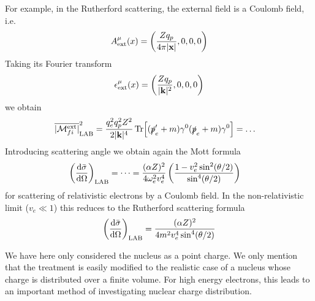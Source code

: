 \documentclass[TheoreticalPhy_ModB.tex]{subfiles}
\begin{document}
For example, in the Rutherford scattering, the external field is a Coulomb field, i.e.
\[A^\mu_{\textup{ext}}(x)=\left(\frac{Zq_p}{4\pi|\vec x|},0,0,0\right)\]
Taking its Fourier transform
\[\epsilon^\mu_{\textup{ext}}(x)=\left(\frac{Zq_p}{|\vec k|^2},0,0,0\right)\]
we obtain
\begin{align*}
\overline{| \mathcal M_{fi}^{\textup{ext}}|}^2_{\textup{LAB}}
&=\frac{q_e^2q_p^2Z^2}{2|\vec k|^4}\Tr[(\slashed p'_e+m)\gamma^0(\slashed p_e+m)\gamma^0]
=\dots
\end{align*}
Introducing scattering angle we obtain again the Mott formula
\begin{align*}
\left(\frac{\de\bar\sigma}{\de\Omega}\right)_{\textup{LAB}}
&=\dots
=\frac{(\alpha Z)^2}{4\omega_e^2v_e^4}\left(\frac{1-v_e^2\sin^2(\theta/2)}{\sin^4(\theta/2)}\right)
\end{align*}
for scattering of relativistic electrons by a Coulomb field. In the non-relativistic limit ($v_e\ll1$) this reduces to the Rutherford scattering formula
\[\left(\frac{\de\bar\sigma}{\de\Omega}\right)_{\textup{LAB}}=\frac{(\alpha Z)^2}{4m^2v_e^4\sin^4(\theta/2)}\]

We have here only considered the nucleus as a point charge. We only mention that the treatment is easily modified to the realistic case of a nucleus whose charge is distributed over a finite volume. For high energy electrons, this leads to an important method of investigating nuclear charge distribution. 
\end{document}
